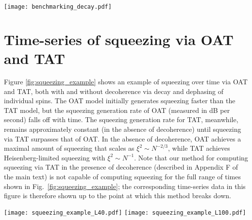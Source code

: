 \documentclass[aps,prx,superscriptaddress,notitlepage,onecolumn,12pt]{revtex4-1}
\renewcommand{\t}{\text} %
\begin{document}
\begin{figure*}
\centering
\texttt{[image: benchmarking\_decay.pdf]}
\caption{{\bf Comparison between the OAT and the spin model in the presence of decoherence.}
({\bf a}) The difference between the maximal squeezing (measured in dB) obtained by the OAT [Eqn.~(4)] and spin [Eqn.~(3)] models increases with the particle number $N$ and the single-particle spontaneous emission rate $\gamma$.
This disagreement is attributed in part to the fact that spontaneous emission transfers population of the collective spin state outside of the Dicke manifold, violating an assumption of the OAT model; see panel ({\bf b}).
The rate of population transfer outside of the Dicke manifold increases with both particle number and spontaneous emission rate.
(Parameters for simulations in this figure: $U=1000$ Hz, $J=200$ Hz, and $\phi=\pi/20$).
}
\label{fig:benchmarking_decay}
\end{figure*}


\section{Time-series of squeezing via OAT and TAT}

Figure \ref{fig:squeezing_example} shows an example of squeezing over time via OAT and TAT, both with and without decoherence via decay and dephasing of individual spins.
The OAT model initially generates squeezing faster than the TAT model, but the squeezing generation rate of OAT (measured in dB per second) falls off with time.
The squeezing generation rate for TAT, meanwhile, remains approximately constant (in the absence of decoherence) until squeezing via TAT surpasses that of OAT.
In the absence of decoherence, OAT achieves a maximal amount of squeezing that scales as $\xi^2\sim N^{-2/3}$, while TAT achieves Heisenberg-limited squeezing with $\xi^2\sim N^{-1}$.
Note that our method for computing squeezing via TAT in the presence of decoherence (described in Appendix F of the main text) is not capable of computing squeezing for the full range of times shown in Fig.~\ref{fig:squeezing_example}; the corresponding time-series data in this figure is therefore shown up to the point at which this method breaks down.

\begin{figure*}
\centering
\texttt{[image: squeezing\_example\_L40.pdf]}
\texttt{[image: squeezing\_example\_L100.pdf]}
\caption{{\bf Squeezing via OAT and TAT} in a 2D section of the 3D $^{87}$Sr optical lattice clock, shown for ({\bf a}) $\ell=40$ and ({\bf b}) $\ell=100$ sites per axis (with $N=\ell^2$ atoms total), and a lattice depth of $V_0=4~E_{\t{R}}$, where $E_{\t{R}}$ is the atomic lattice recoil energy.
Atoms are confined along the direction transverse to the 2D layer by a lattice of depth 60 $E_{\t{R}}$.
Squeezing over time is shown for OAT (blue) and TAT (green), both with (solid lines) and without (dashed lines) decoherence via uncorrelated decay and dephasing of individual spins at rates of $0.1~\t{sec}^{-1}$ (see Appendix E of the main text).
}
\label{fig:squeezing_example}
\end{figure*}
\end{document}
